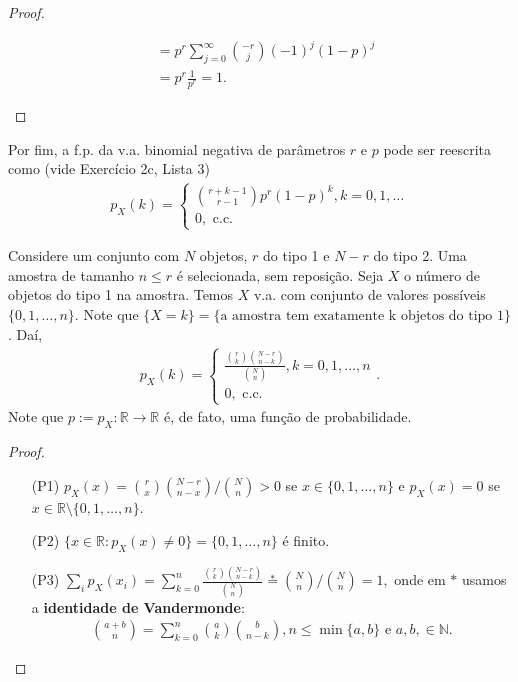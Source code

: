 \documentclass[../Notas.tex]{subfiles}
\begin{document}
\begin{example}
\begin{proof}
\begin{itemize}
\begin{align*}
        &= p^r\sum_{j=0}^{\infty}\binom{-r}{j}(-1)^j(1-p)^j \\
        &= p^r\frac{1}{p^r} = 1.
    \end{align*}
\end{itemize}
\end{proof}
Por fim, a f.p. da v.a. binomial negativa de parâmetros $r$ e $p$ pode ser reescrita como (vide Exercício 2c, Lista 3)
\begin{align*}
    p_X(k) = \begin{cases}
    \binom{r+k-1}{r-1}p^r(1-p)^{k}, k = 0, 1, \dots \\
    0, \text{ c.c.}
    \end{cases}
\end{align*}
\end{example}

\begin{example}
Considere um conjunto com $N$ objetos, $r$ do tipo 1 e $N-r$ do tipo 2. Uma amostra de tamanho $n\leq r$ é selecionada, sem reposição. Seja $X$ o número de objetos do tipo 1 na amostra. Temos $X$ v.a. com conjunto de valores possíveis $\{ 0, 1, \dots, n \}$. Note que $\{ X=k \} = \{ \text{a amostra tem exatamente k objetos do tipo 1} \}$. Daí, 
\begin{align*}
    p_X(k) = \begin{cases}
    \frac{ \binom{r}{k}\binom{N-r}{n-k} }{\binom{N}{n}}, k = 0, 1, \dots, n \\
    0, \text{ c.c.}
    \end{cases}.
\end{align*}
Note que $p:=p_X:\mathbb{R}\to\mathbb{R}$ é, de fato, uma função de probabilidade.
\begin{proof}
\begin{itemize}
    \item[(P1)] $p_X(x) = \binom{r}{x}\binom{N-r}{n-x}/\binom{N}{n} > 0$ se $x\in\{ 0,1,\dots, n \}$ e $p_X(x) = 0$ se $x\in\mathbb{R}\setminus\{ 0,1,\dots, n \}$.
    \item[(P2)] $\{ x\in\mathbb{R} : p_X(x)\neq 0 \} = \{0, 1, \dots, n\}$ é finito.
    \item[(P3)] $\displaystyle{ \sum_i p_X(x_i) = \sum_{k=0}^{n}\frac{\binom{r}{k}\binom{N-r}{n-k}}{\binom{N}{n}} \stackrel{*}{=} \binom{N}{n}/\binom{N}{n} = 1,}$ onde em $*$ usamos a \textbf{identidade de Vandermonde}:
    \begin{align*}
        \binom{a+b}{n} = \sum_{k=0}^{n}\binom{a}{k}\binom{b}{n-k}, n\leq\min\{a,b\} \text{ e } a,b,\in\mathbb{N}.
    \end{align*}
\end{itemize}
\end{proof}
\end{example}
\end{document}
